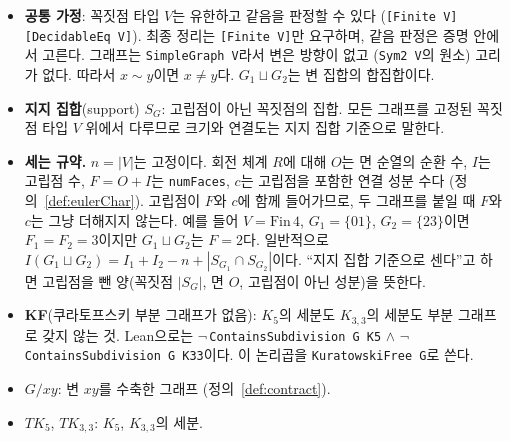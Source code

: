 \begin{itemize}
  \item \textbf{공통 가정}: 꼭짓점 타입 \(V\)는 유한하고 같음을 판정할 수 있다
        (\texttt{[Finite V] [DecidableEq V]}). 최종 정리는 \texttt{[Finite V]}만 요구하며,
        같음 판정은 증명 안에서 고른다. 그래프는 \texttt{SimpleGraph V}라서 변은 방향이 없고
        (\texttt{Sym2 V}의 원소) 고리가 없다. 따라서 \(x \sim y\)이면 \(x \ne y\)다. \(G_1 \sqcup G_2\)는 변
        집합의 합집합이다.
  \item \textbf{지지 집합}(support) \(S_G\): 고립점이 아닌 꼭짓점의 집합. 모든 그래프를 고정된 꼭짓점 타입
        \(V\) 위에서 다루므로 크기와 연결도는 지지 집합 기준으로 말한다.
  \item \textbf{세는 규약.} \(n = |V|\)는 고정이다. 회전 체계 \(R\)에 대해 \(O\)는 면 순열의 순환 수, \(I\)는
        고립점 수, \(F = O + I\)는 \texttt{numFaces}, \(c\)는 고립점을 포함한 연결 성분 수다
        (정의~\ref{def:eulerChar}). 고립점이 \(F\)와 \(c\)에 함께 들어가므로, 두 그래프를 붙일 때 \(F\)와
        \(c\)는 그냥 더해지지 않는다. 예를 들어 \(V = \mathrm{Fin}\,4\), \(G_1 = \{01\}\), \(G_2 = \{23\}\)이면
        \(F_1 = F_2 = 3\)이지만 \(G_1 \sqcup G_2\)는 \(F = 2\)다. 일반적으로
        \(I(G_1 \sqcup G_2) = I_1 + I_2 - n + |S_{G_1} \cap S_{G_2}|\)이다. ``지지 집합 기준으로 센다''고 하면
        고립점을 뺀 양(꼭짓점 \(|S_G|\), 면 \(O\), 고립점이 아닌 성분)을 뜻한다.
  \item \textbf{KF}(쿠라토프스키 부분 그래프가 없음): \(K_5\)의 세분도 \(K_{3,3}\)의 세분도 부분 그래프로
        갖지 않는 것. Lean으로는
        \(\neg\)\,\texttt{ContainsSubdivision G K5} \(\wedge\) \(\neg\)\,\texttt{ContainsSubdivision G K33}이다.
        이 논리곱을 \texttt{KuratowskiFree G}로 쓴다.
  \item \(G/xy\): 변 \(xy\)를 수축한 그래프 (정의~\ref{def:contract}).
  \item \(TK_5\), \(TK_{3,3}\): \(K_5\), \(K_{3,3}\)의 세분.
\end{itemize}
